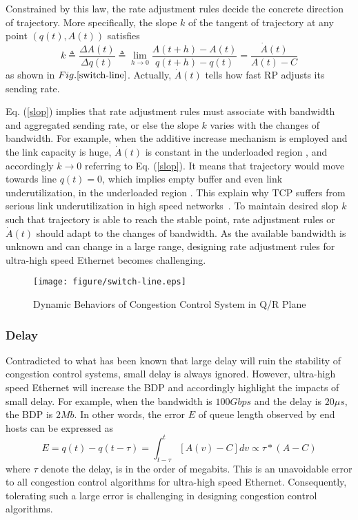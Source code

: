 \documentclass{sig-alternate-10pt}
\def\figurename{Fig.}
\begin{document}
Constrained by this law, the rate adjustment rules decide the concrete direction of trajectory. More specifically, the slope $k$ of the tangent of trajectory at any point $(q(t), A(t))$ satisfies 
\begin{equation}
k\triangleq\frac{\Delta A(t)}{\Delta q(t)}\triangleq\lim\limits_{h\rightarrow 0}\frac{A(t+h)-A(t)}{q(t+h)-q(t)}=\frac{\dot{A}(t)}{A(t)-C}
\label{slop}
\end{equation}
as shown in $\figurename{\ref{switch-line}}$. Actually, $\dot{A}(t)$ tells how fast RP adjusts its sending rate.


Eq. (\ref{slop}) implies that rate adjustment rules must associate with bandwidth and aggregated sending rate, or else the slope $k$ varies with the changes of bandwidth. For example, when the additive increase mechanism is employed and the link capacity is huge, $\dot{A}(t)$ is constant in the underloaded region , and accordingly $k\rightarrow0$ referring to Eq. (\ref{slop}). It means that trajectory would move towards line $q(t)=0$, which implies empty buffer and even link underutilization, in the underloaded region . This explain why TCP suffers from serious link underutilization in high speed networks~\cite{HS-TCP}. To maintain desired slop $k$ such that trajectory is able to reach the stable point, rate adjustment rules or $\dot{A}(t)$ should adapt to the changes of bandwidth. As the available bandwidth is unknown and can change in a large range, designing rate adjustment rules for ultra-high speed Ethernet becomes challenging.


\begin{figure}
\centering
\texttt{[image: figure/switch-line.eps]}
\caption{Dynamic Behaviors of Congestion Control System in Q/R Plane}
\label{switch-line}
\end{figure}


\subsubsection{Delay}
Contradicted to what has been known that large delay will ruin the stability of congestion control systems, small delay is always ignored. However, ultra-high speed Ethernet will increase the BDP and accordingly highlight the impacts of small delay. For example, when the bandwidth is $100Gbps$ and the delay is $20\mu s$, the BDP is $2Mb$. In other words, the error $E$ of queue length observed by end hosts can be expressed as
\begin{equation}
E=q(t)-q(t-\tau)=\int^t_{t-\tau}{[A(v)-C]}dv\propto \tau*(A-C)
\label{E_1}
\end{equation}
where $\tau$ denote the delay, is in the order of megabits. This is an unavoidable error to all congestion control algorithms for ultra-high speed Ethernet. Consequently, tolerating such a large error is challenging in designing congestion control algorithms. 
\end{document}
